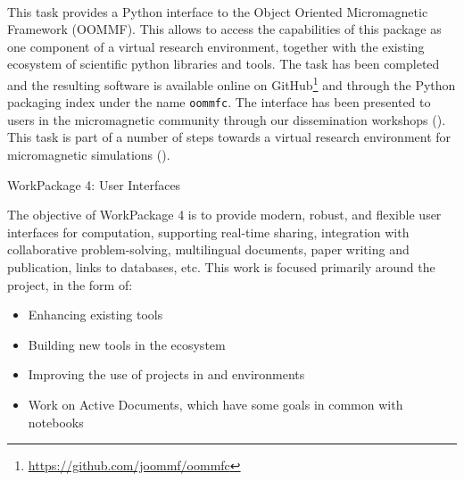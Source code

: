 \documentclass{deliverablereport}
\makeatletter
\renewcommand\subsubsection{\@startsection{subsubsection}{2}%
  \z@{.5\linespacing\@plus.7\linespacing}{.1\linespacing}%
  {\normalfont\bfseries}}
\makeatother
\begin{document}
  \paragraph{}
  This task provides a Python interface to the Object Oriented
  Micromagnetic Framework (OOMMF). This allows to access the
  capabilities of this package as one component of a virtual research
  environment, together with the existing ecosystem of scientific
  python libraries and tools. The task has been completed and the
  resulting software is available online on
  GitHub\footnote{\url{https://github.com/joommf/oommfc}} and through
  the Python packaging index under the name \texttt{oommfc}. The
  interface has been presented to users in the micromagnetic community
  through our dissemination workshops
  (). This
  task is part of a number of steps towards a virtual research
  environment for micromagnetic simulations
  ().

\clearpage
\subsubsection{WorkPackage 4: User Interfaces}

The objective of WorkPackage 4 is to provide modern, robust, and flexible user interfaces for
computation, supporting real-time sharing, integration with collaborative problem-solving,
multilingual documents, paper writing and publication, links to databases, etc. This work is focused primarily around the \Jupyter project, in the form of:

\begin{itemize}
    \item Enhancing existing \Jupyter tools
    \item Building new tools in the \Jupyter ecosystem
    \item Improving the use of \ODK projects %
      in \Jupyter and \Sage environments
    \item Work on Active Documents, which have some goals in common with \Jupyter notebooks
\end{itemize}
\end{document}
